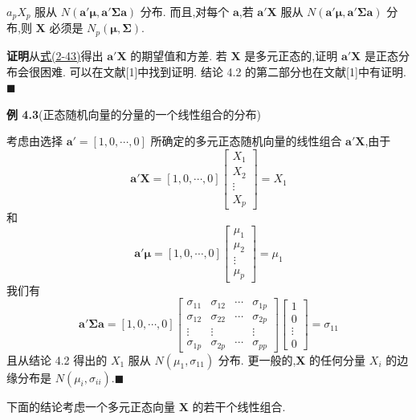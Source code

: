 $a_pX_p$ 服从 $N(\mathbf{a}'\boldsymbol{\mu},\mathbf{a}'\boldsymbol{\Sigma}\mathbf{a})$ 分布. 而且,对每个 $\mathbf{a}$,若 $\mathbf{a}'\mathbf{X}$ 服从 $N(\mathbf{a}'\boldsymbol{\mu},\mathbf{a}'\boldsymbol{\Sigma}\mathbf{a})$ 分布,则 $\mathbf{X}$ 必须是 $N_p(\boldsymbol{\mu},\boldsymbol{\Sigma})$.

\noindent\textbf{证明}\quad 从\hyperref[eq:2-43]{式(2-43)}得出 $\mathbf{a}'\mathbf{X}$ 的期望值和方差. 若 $\mathbf{X}$ 是多元正态的,证明 $\mathbf{a}'\mathbf{X}$ 是正态分布会很困难. 可以在文献[1]中找到证明. 结论 4.2 的第二部分也在文献[1]中有证明.\hfill$\blacksquare$

\noindent\textbf{例 4.3}\quad (正态随机向量的分量的一个线性组合的分布)

考虑由选择 $\mathbf{a}'=[1,0,\cdots,0]$ 所确定的多元正态随机向量的线性组合 $\mathbf{a}'\mathbf{X}$,由于
\[
\mathbf{a}'\mathbf{X}=[1,0,\cdots,0]\begin{bmatrix}X_1\\X_2\\\vdots\\X_p\end{bmatrix}=X_1
\]
和
\[
\mathbf{a}'\boldsymbol{\mu}=[1,0,\cdots,0]\begin{bmatrix}\mu_1\\\mu_2\\\vdots\\\mu_p\end{bmatrix}=\mu_1
\]
我们有
\[
\mathbf{a}'\boldsymbol{\Sigma}\mathbf{a}=[1,0,\cdots,0]\begin{bmatrix}\sigma_{11}&\sigma_{12}&\cdots&\sigma_{1p}\\\sigma_{12}&\sigma_{22}&\cdots&\sigma_{2p}\\\vdots&\vdots&&\vdots\\\sigma_{1p}&\sigma_{2p}&\cdots&\sigma_{pp}\end{bmatrix}\begin{bmatrix}1\\0\\\vdots\\0\end{bmatrix}=\sigma_{11}
\]
且从结论 4.2 得出的 $X_1$ 服从 $N(\mu_1,\sigma_{11})$ 分布. 更一般的,$\mathbf{X}$ 的任何分量 $X_i$ 的边缘分布是 $N(\mu_i,\sigma_{ii})$.\hfill$\blacksquare$

下面的结论考虑一个多元正态向量 $\mathbf{X}$ 的若干个线性组合.


